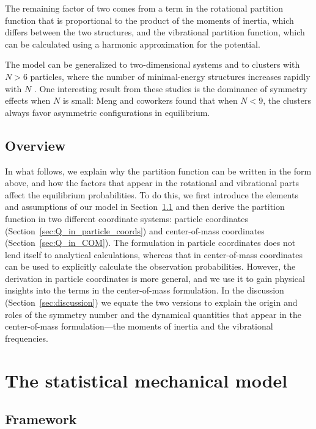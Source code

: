 \documentclass[pre, aps, twocolumn, reprint, amsmath,amssymb, showpacs,
superscriptaddress] {revtex4-1}
\begin{document}
The remaining factor of two comes from a term in the rotational
partition function that is proportional to the product of the moments of
inertia, which differs between the two structures, and the vibrational
partition function, which can be calculated using a harmonic
approximation for the potential.

The model can be generalized to two-dimensional systems \cite{morgan14,
  perry_two-dimensional_2015} and to clusters with $N>6$ particles,
where the number of minimal-energy structures increases rapidly with $N$
\cite{meng10, perry12, kallus_free_2017}. One interesting result from
these studies is the dominance of symmetry effects when $N$ is small:
Meng and coworkers found that when $N<9$, the clusters always favor
asymmetric configurations in equilibrium.


\subsection{Overview}
\label{sec:overview}

In what follows, we explain why the partition function can be written in
the form above, and how the factors that appear in the rotational and
vibrational parts affect the equilibrium probabilities. To do this, we
first introduce the elements and assumptions of our model in
Section~\ref{sec:framework} and then derive the partition function in
two different coordinate systems: particle coordinates
(Section~\ref{sec:Q_in_particle_coords}) and center-of-mass coordinates
(Section~\ref{sec:Q_in_COM}). The formulation in particle coordinates
does not lend itself to analytical calculations, whereas that in
center-of-mass coordinates can be used to explicitly calculate the
observation probabilities. However, the derivation in particle
coordinates is more general, and we use it to gain physical insights
into the terms in the center-of-mass formulation. In the discussion
(Section~\ref{sec:discussion}) we equate the two versions to explain
the origin and roles of the symmetry number and the dynamical quantities
that appear in the center-of-mass formulation---the moments of inertia
and the vibrational frequencies.

\section{The statistical mechanical model}
\label{sec:stat-mech-model}

\subsection{Framework}
\label{sec:framework}
\end{document}
